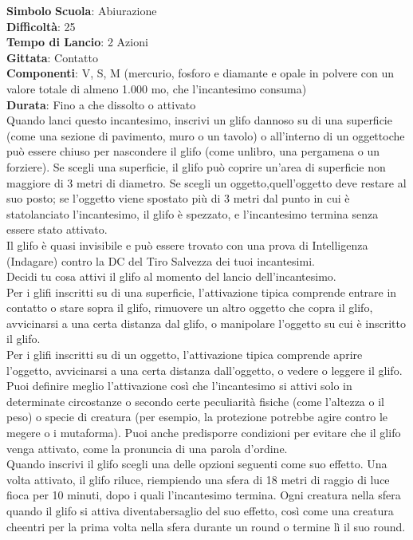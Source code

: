 \begin{multicols}{2}
\medskip\textbf{Simbolo}
\textbf{Scuola}: Abiurazione\\
\textbf{Difficoltà}:  25\\
\textbf{Tempo di Lancio}: 2 Azioni\\
\textbf{Gittata}: Contatto\\
\textbf{Componenti}: V, S, M (mercurio, fosforo e diamante e opale in polvere con un valore totale di almeno 1.000 mo, che l'incantesimo consuma)\\
\textbf{Durata}: Fino a che dissolto o attivato\\
Quando lanci questo incantesimo, inscrivi un glifo dannoso su di una superficie (come una sezione di pavimento, muro o un tavolo) o all'interno di un oggettoche può essere chiuso per nascondere il  glifo (come unlibro, una pergamena o un forziere). Se scegli una  superficie, il glifo può coprire un'area di superficie non maggiore di 3 metri di diametro. Se scegli un oggetto,quell'oggetto deve  restare al suo posto; se l’oggetto  viene spostato più di 3 metri dal punto in cui è statolanciato  l'incantesimo, il glifo è spezzato, e l'incantesimo termina senza essere stato attivato.\\
Il glifo è quasi invisibile e può essere trovato con una prova di Intelligenza (Indagare) contro la DC del Tiro Salvezza dei tuoi incantesimi.\\
Decidi tu cosa attivi il glifo al momento del lancio dell'incantesimo.\\
Per i glifi inscritti su di una superficie, l’attivazione tipica comprende entrare in contatto o stare sopra il glifo, rimuovere un altro oggetto che copra il glifo, avvicinarsi a una certa distanza dal glifo, o manipolare l’oggetto su cui è inscritto il glifo.\\
Per i glifi inscritti su di un oggetto, l’attivazione tipica comprende aprire l’oggetto, avvicinarsi a una certa distanza dall'oggetto, o vedere o leggere il glifo.\\
Puoi definire meglio l’attivazione così che l'incantesimo si attivi solo in determinate circostanze o secondo certe peculiarità fisiche (come l’altezza o il peso) o specie di creatura (per esempio, la protezione potrebbe agire contro le megere o i mutaforma). Puoi anche predisporre condizioni per evitare che il glifo venga  attivato, come la pronuncia di una parola d’ordine.\\
Quando inscrivi il glifo scegli una delle opzioni seguenti come suo effetto. Una volta attivato, il glifo riluce, riempiendo una sfera di 18 metri di raggio di luce fioca per 10 minuti, dopo i quali l'incantesimo termina. Ogni creatura nella sfera quando il glifo si attiva diventabersaglio del suo  effetto, così come una creatura cheentri per la prima volta nella sfera durante un round o  termine lì il suo round.\\

\end{multicols}
